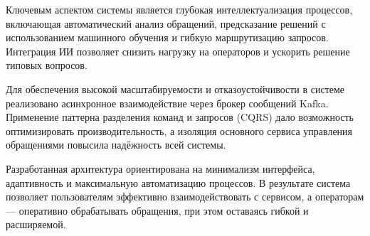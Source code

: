 Ключевым аспектом системы является глубокая интеллектуализация процессов, включающая автоматический анализ обращений, предсказание решений с использованием машинного обучения и гибкую маршрутизацию запросов. Интеграция ИИ позволяет снизить нагрузку на операторов и ускорить решение типовых вопросов.

Для обеспечения высокой масштабируемости и отказоустойчивости в системе реализовано асинхронное взаимодействие через брокер сообщений Kafka. Применение паттерна разделения команд и запросов (CQRS) дало возможность оптимизировать производительность, а изоляция основного сервиса управления обращениями повысила надёжность всей системы.

Разработанная архитектура ориентирована на минимализм интерфейса, адаптивность и максимальную автоматизацию процессов. В результате система позволяет пользователям эффективно взаимодействовать с сервисом, а операторам — оперативно обрабатывать обращения, при этом оставаясь гибкой и расширяемой.
